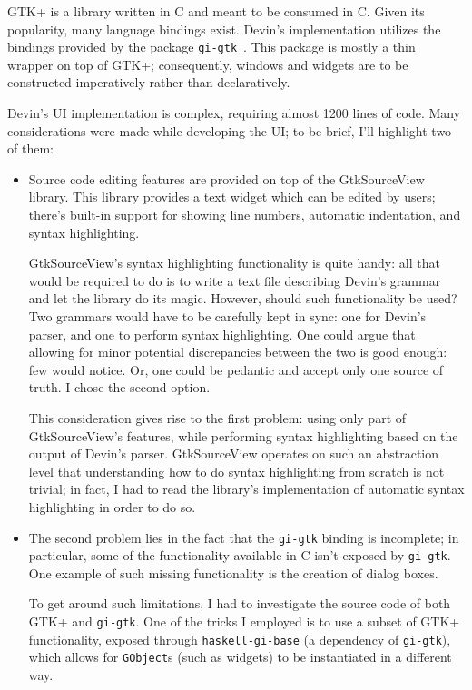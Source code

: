 \documentclass[UdineBachThesis,american,11pt]{PhdThesis}
\begin{document}
  GTK+ is a library written in C and meant to be consumed in C. Given its
  popularity, many language bindings exist. Devin's implementation utilizes the
  bindings provided by the package \mbox{\texttt{gi-gtk}}~\cite{gi-gtk}. This
  package is mostly a thin wrapper on top of GTK+; consequently, windows and
  widgets are to be constructed imperatively rather than declaratively.

  Devin's UI implementation is complex, requiring almost 1200 lines of code.
  Many considerations were made while developing the UI; to be brief, I'll
  highlight two of them:

  \begin{itemize}
    \item Source code editing features are provided on top of the GtkSourceView
    library. This library provides a text widget which can be edited by users;
    there's built-in support for showing line numbers, automatic indentation,
    and syntax highlighting.

    \pagebreak

    GtkSourceView's syntax highlighting functionality is quite handy: all that
    would be required to do is to write a text file describing Devin's grammar
    and let the library do its magic. However, should such functionality be
    used? Two grammars would have to be carefully kept in sync: one for Devin's
    parser, and one to perform syntax highlighting. One could argue that
    allowing for minor potential discrepancies between the two is good enough:
    few would notice. Or, one could be pedantic and accept only one source of
    truth. I chose the second option.

    This consideration gives rise to the first problem: using only part of
    GtkSourceView's features, while performing syntax highlighting based on the
    output of Devin's parser. GtkSourceView operates on such an abstraction
    level that understanding how to do syntax highlighting from scratch is not
    trivial; in fact, I had to read the library's implementation of automatic
    syntax highlighting in order to do so.

    \item The second problem lies in the fact that the \mbox{\texttt{gi-gtk}}
    binding is incomplete; in particular, some of the functionality available in
    C isn't exposed by \mbox{\texttt{gi-gtk}}. One example of such missing
    functionality is the creation of dialog boxes.

    To get around such limitations, I had to investigate the source code of both
    GTK+ and \mbox{\texttt{gi-gtk}}. One of the tricks I employed is to use a
    subset of GTK+ functionality, exposed through
    \mbox{\texttt{haskell-gi-base}} (a dependency of \mbox{\texttt{gi-gtk}}),
    which allows for \mbox{\texttt{GObject}s} (such as widgets) to be
    instantiated in a different way.
  \end{itemize}
\end{document}
